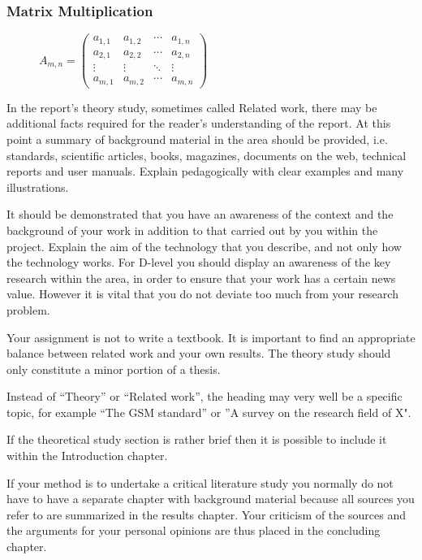 \subsubsection{Matrix Multiplication}

\begin{figure}[H]
	\begin{center}
$A_{m,n} = 
\begin{pmatrix}
a_{1,1} & a_{1,2} & \cdots & a_{1,n} \\
a_{2,1} & a_{2,2} & \cdots & a_{2,n} \\
\vdots  & \vdots  & \ddots & \vdots  \\
a_{m,1} & a_{m,2} & \cdots & a_{m,n} 
\end{pmatrix}$
	\end{center}
\end{figure}

\iffalse
In the report's theory study, sometimes called Related work, there may be additional facts required for the reader's understanding of the report. At this point a summary of background material in the area should be provided, i.e. standards, scientific articles, books, magazines, documents on the web, technical reports and user manuals. Explain pedagogically with clear examples and many illustrations.

It should be demonstrated that you have an awareness of the context and the background of your work in addition to that carried out by you within the project. Explain the aim of the technology that you describe, and not only how the technology works. For D-level you should display an awareness of the key research within the area, in order to ensure that your work has a certain news value. However it is vital that you do not deviate too much from your research problem.

Your assignment is not to write a textbook. It is important to find an appropriate balance between related work and your own results. The theory study should only constitute a minor portion of a thesis.

Instead of “Theory” or “Related work”, the heading may very well be a specific topic, for example “The GSM standard” or ”A survey on the research field of X".

If the theoretical study section is rather brief then it is possible to include it within the Introduction chapter.

If your method is to undertake a critical literature study you normally do not have to have a separate chapter with background material because all sources you refer to are summarized in the results chapter. Your criticism of the sources and the arguments for your personal opinions are thus placed in the concluding chapter.

